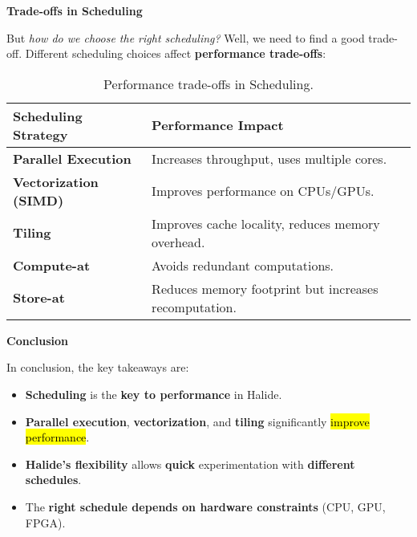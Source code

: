 \highspace
\begin{flushleft}
    \textcolor{Green3}{ \textbf{Trade-offs in Scheduling}}
\end{flushleft}
But \emph{how do we choose the right scheduling?} Well, we need to find a good trade-off.
Different scheduling choices affect \textbf{performance trade-offs}:
\begin{table}[!htp]
    \centering
    \begin{tabular}{@{} l p{20em} @{}}
        \toprule
        \textbf{Scheduling Strategy} & \textbf{Performance Impact} \\
        \midrule
        \textbf{Parallel Execution} & Increases throughput, uses multiple cores. \\
        \textbf{Vectorization (SIMD)} & Improves performance on CPUs/GPUs. \\
        \textbf{Tiling} & Improves cache locality, reduces memory overhead. \\
        \textbf{Compute-at} & Avoids redundant computations. \\
        \textbf{Store-at} & Reduces memory footprint but increases recomputation. \\
        \bottomrule
    \end{tabular}
    \caption{Performance trade-offs in Scheduling.}
\end{table}

\highspace
\begin{flushleft}
    \textcolor{Green3}{ \textbf{Conclusion}}
\end{flushleft}
In conclusion, the key takeaways are:
\begin{itemize}
    \item \textbf{Scheduling} is the \textbf{key to performance} in Halide.
    \item \textbf{Parallel execution}, \textbf{vectorization}, and \textbf{tiling} significantly \hl{improve performance}.
    \item \textbf{Halide's flexibility} allows \textbf{quick} experimentation with \textbf{different} \textbf{schedules}.
    \item The \textbf{right schedule depends on hardware constraints} (CPU, GPU, FPGA).
\end{itemize}